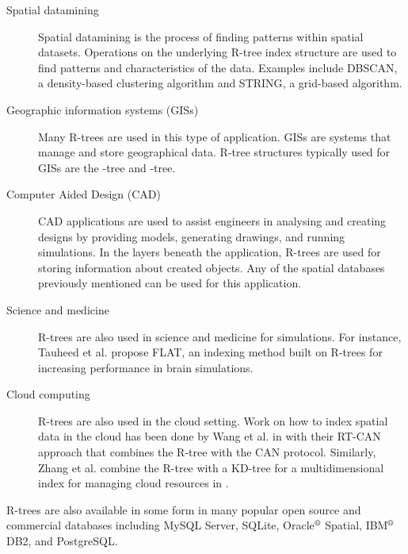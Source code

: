 \begin{description}
	\item[Spatial datamining] Spatial datamining is the process of finding
	patterns within spatial datasets. Operations on the underlying R-tree 
	index structure are used to find patterns and characteristics of the 
	data. Examples include DBSCAN\cite{ester1996density}, a density-based 
	clustering algorithm and STRING\cite{wang1997sting}, a grid-based 
	algorithm. 
	\item[Geographic information systems (GISs)] Many R-trees are used in 
	this type of application. GISs are systems that manage and store 
	geographical data. R-tree structures typically used for GISs are the 
	\rbase-tree\cite{guttman84} and \rstar-tree\cite{beckmannkriegelschneiderseeger90}.
	\item[Computer Aided Design (CAD)] CAD applications are used to assist
	engineers in analysing and creating designs by providing models, 
	generating drawings, and running simulations. In the layers beneath the
	application, R-trees are used for storing information about created 
	objects. Any of the spatial databases previously mentioned can be used 
	for this application. 
	\item[Science and medicine] R-trees are also used in science and 
	medicine for simulations. For instance, Tauheed et al. propose FLAT, an 
	indexing method built on R-trees for increasing performance in brain 
	simulations\cite{tauheed2012accelerating}.
	\item[Cloud computing] R-trees are also used in the cloud setting. Work
	on how to index spatial data in the cloud has been done by Wang et al. in	 \cite{wang2009retrieving} with their RT-CAN approach that combines the 
	R-tree with the CAN protocol. Similarly, Zhang et al. combine the R-tree
	with a KD-tree for a multidimensional index for managing cloud resources 
	in \cite{zhang2009efficient}.
\end{description}

R-trees are also available in some form in many popular open source and 
commercial databases including MySQL Server, SQLite, Oracle$\textsuperscript{\textregistered}$ Spatial, IBM$\textsuperscript{\textregistered}$ DB2, and 
PostgreSQL. 


